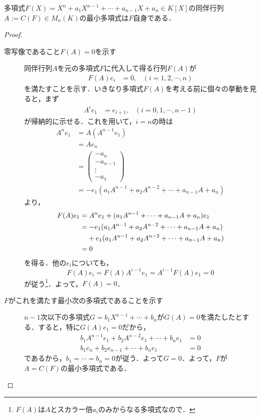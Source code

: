\documentclass[uplatex, dvipdfmx]{jsreport}
\begin{document}
\begin{proposition}
    多項式$F(X) = X^n+a_1X^{n-1}+\cdots +a_{n-1}X+a_n \in K[X]$の同伴行列$A:=C(F)\in M_n(K)$の最小多項式は$F$自身である．
\end{proposition}
\begin{proof}
    \begin{description}
        \item[零写像であること$F(A)=0$を示す] 
        同伴行列$A$を元の多項式$F$に代入して得る行列$F(A)$が
        \begin{align}
            F(A)e_i&=0,&(i=1,2,\cdots,n)
        \end{align}
        を満たすことを示す．いきなり多項式$F(A)$を考える前に個々の挙動を見ると，まず
        \begin{align*}
            A^ie_1&=e_{i+1},&(i=0,1,\cdots,n-1)
        \end{align*}
        が帰納的に示せる．これを用いて，$i=n$の時は
        \begin{align*}
            A^ne_1&=A(A^{n-1}e_1)\\
            &=Ae_n\\
            &=\begin{pmatrix}-a_n\\-a_{n-1}\\\vdots\\-a_1\end{pmatrix}\\
            &=-e_1(a_1A^{n-1}+a_2A^{n-2}+\cdots+a_{n-1}A+a_n)
        \end{align*}
        より，
        \begin{align*}
            F(A)e_1&=A^ne_1+(a_1A^{n-1}+\cdots+a_{n-1}A+a_n)e_1\\
            &=-e_1(a_1A^{n-1}+a_2A^{n-2}+\cdots+a_{n-1}A+a_n)\\
            &\hphantom{=}\;+e_1(a_1A^{n-1}+a_2A^{n-2}+\cdots+a_{n-1}A+a_n)\\
            &=0
        \end{align*}
        を得る．他の$e_i$についても，
        \[F(A)e_i=F(A)A^{i-1}e_1=A^{i-1}F(A)e_1=0\]
        が従う\footnote{$F(A)$は$A$とスカラー倍$a_i$のみからなる多項式なので．}．よって，$F(A)=0$．
        \item[$F$がこれを満たす最小次の多項式であることを示す] 
        $n-1$次以下の多項式$G=b_1X^{n-1}+\cdots+b_n$が$G(A)=0$を満たしたとする．すると，特に$G(A)e_1=0$だから，
        \begin{align*}
            b_1A^{n-1}e_1+b_2A^{n-2}e_1+\cdots+b_ne_1&=0\\
            b_1e_n+b_2e_{n-1}+\cdots+b_ne_1&=0
        \end{align*}
        であるから，$b_1=\cdots=b_n=0$が従う．よって$G=0$．よって，$F$が$A=C(F)$の最小多項式である．
    \end{description}
\end{proof}
\end{document}
